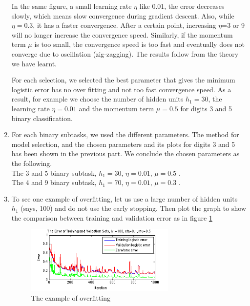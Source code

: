 \begin{enumerate}[(1)]
In the same figure, a small learning rate $\eta$ like 0.01, the error decreases slowly, which means slow convergence during gradient descent. Also, while  $\eta=0.3$, it has a faster convergence. After a certain point, increasing $\eta$=3 or 9 will no longer increase the convergence speed. Similarly, if the momentum term $\mu$ is too small, the convergence speed is too fast and eventually does not converge due to oscillation (zig-zagging). The results follow from the theory we have learnt.

For each selection, we selected the best parameter that gives the minimum logistic error has no over fitting and not too fast convergence speed. As a result, for example we choose the number of hidden units $h_1=30$, the learning rate $\eta=0.01$ and the momentum term $\mu=0.5$ for digits 3 and 5 binary classification.

\item For each binary subtasks, we used the different parameters. The method for model selection, and the chosen parameters and its plots for digits 3 and 5 has been shown in the previous part. We conclude the chosen parameters as the following.\\
The 3 and 5 binary subtask, $h_1=30$, $\eta=0.01$, $\mu=0.5$ . \\
The 4 and 9 binary subtask, $h_1=70$, $\eta=0.01$, $\mu=0.3$ . \\ 

\item To see one example of overfitting, let us use a large number of hidden units $h_1$ (says, 100) and do not use the early stopping. Then plot the graph to show the comparison between training and validation error as in figure \ref{fig:overfitting}
	\begin{figure}[htbp]
		\centering
		\includegraphics[width=0.7\textwidth]{plots/overfitting.png}
		\caption{The example of overfitting}
		\label{fig:overfitting}
	\end{figure}
\end{enumerate}

